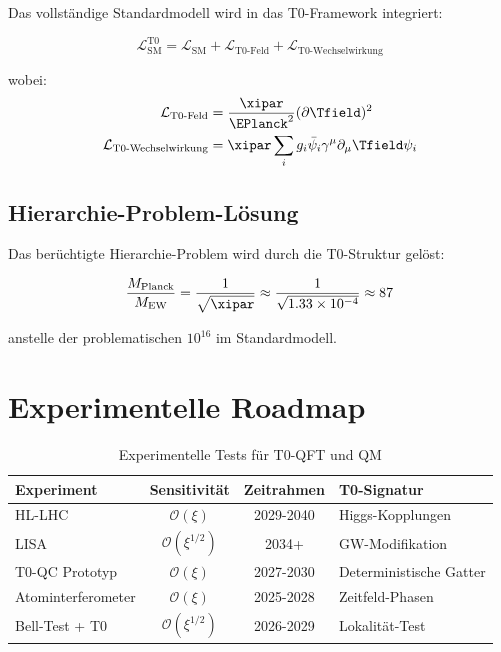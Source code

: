 	Das vollständige Standardmodell wird in das T0-Framework integriert:
	
	\begin{equation}
		\mathcal{L}_{\text{SM}}^{\text{T0}} = \mathcal{L}_{\text{SM}} + \mathcal{L}_{\text{T0-Feld}} + \mathcal{L}_{\text{T0-Wechselwirkung}}
	\end{equation}
	
	wobei:
	\begin{align}
		\mathcal{L}_{\text{T0-Feld}} &= \frac{\xipar}{\EPlanck^2} (\partial \Tfield)^2 \\
		\mathcal{L}_{\text{T0-Wechselwirkung}} &= \xipar \sum_i g_i \bar{\psi}_i \gamma^\mu \partial_\mu \Tfield \psi_i
	\end{align}
	
	\subsection{Hierarchie-Problem-Lösung}
	
	Das berüchtigte Hierarchie-Problem wird durch die T0-Struktur gelöst:
	
	\begin{equation}
		\frac{M_{\text{Planck}}}{M_{\text{EW}}} = \frac{1}{\sqrt{\xipar}} \approx \frac{1}{\sqrt{1.33 \times 10^{-4}}} \approx 87
	\end{equation}
	
	anstelle der problematischen $10^{16}$ im Standardmodell.
	
	\section{Experimentelle Roadmap}
	
	\begin{table}[htbp]
		\centering
		\begin{tabular}{lccl}
			\toprule
			\textbf{Experiment} & \textbf{Sensitivität} & \textbf{Zeitrahmen} & \textbf{T0-Signatur} \\
			\midrule
			HL-LHC & $\mathcal{O}(\xi)$ & 2029-2040 & Higgs-Kopplungen \\
			LISA & $\mathcal{O}(\xi^{1/2})$ & 2034+ & GW-Modifikation \\
			T0-QC Prototyp & $\mathcal{O}(\xi)$ & 2027-2030 & Deterministische Gatter \\
			Atominterferometer & $\mathcal{O}(\xi)$ & 2025-2028 & Zeitfeld-Phasen \\
			Bell-Test + T0 & $\mathcal{O}(\xi^{1/2})$ & 2026-2029 & Lokalität-Test \\
			\bottomrule
		\end{tabular}
		\caption{Experimentelle Tests für T0-QFT und QM}
		\label{tab:t0_experimental_tests}
	\end{table}
	
